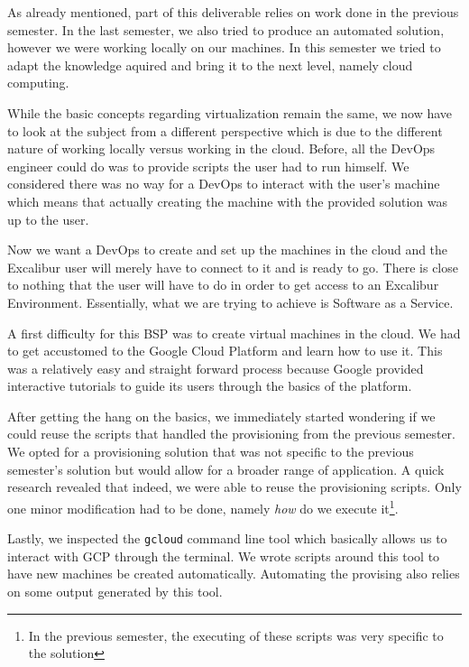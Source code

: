 As already mentioned, part of this deliverable relies on work done in
the previous semester. In the last semester, we also tried to produce
an automated solution, however we were working locally on our
machines. In this semester we tried to adapt the knowledge aquired and
bring it to the next level, namely cloud computing. 

While the basic concepts regarding virtualization remain the same, we
now have to look at the subject from a different perspective which is
due to the different nature of working locally versus working in the
cloud. Before, all the DevOps engineer could do was to provide scripts
the user had to run himself.  We considered there was no way for a
DevOps to interact with the user's machine which means that actually
creating the machine with the provided solution was up to the user.

Now we want a DevOps to create and set up the machines in the cloud
and the Excalibur user will merely have to connect to it and is ready
to go. There is close to nothing that the user will have to do in
order to get access to an Excalibur Environment.  Essentially, what we
are trying to achieve is Software as a Service.

A first difficulty for this BSP was to create virtual machines in the
cloud. We had to get accustomed to the Google Cloud Platform and learn
how to use it. This was a relatively easy and straight forward process
because Google provided interactive tutorials to guide its users
through the basics of the platform.

After getting the hang on the basics, we immediately started wondering
if we could reuse the scripts that handled the provisioning from the
previous semester. We opted for a provisioning solution that was not
specific to the previous semester's solution but would allow for a
broader range of application.  A quick research revealed that indeed,
we were able to reuse the provisioning scripts. Only one minor
modification had to be done, namely \textit{how} do we execute
it\footnote{In the previous semester, the executing of these scripts
was very specific to the solution}.

Lastly, we inspected the \texttt{gcloud} command line tool which
basically allows us to interact with GCP through the terminal. We
wrote scripts around this tool to have new machines be created
automatically. Automating the provising also relies on some output
generated by this tool.
